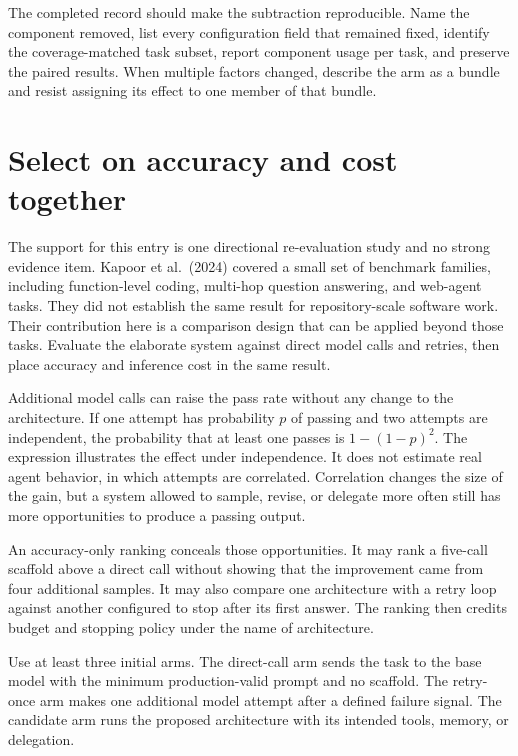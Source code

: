 The completed record should make the subtraction reproducible. Name the component removed, list every configuration field that remained fixed, identify the coverage-matched task subset, report component usage per task, and preserve the paired results. When multiple factors changed, describe the arm as a bundle and resist assigning its effect to one member of that bundle.

\section{Select on accuracy and cost together}\label{select-on-accuracy-and-cost-together}

The support for this entry is one directional re-evaluation study and no strong evidence item. Kapoor et al.~(2024) covered a small set of benchmark families, including function-level coding, multi-hop question answering, and web-agent tasks. They did not establish the same result for repository-scale software work. Their contribution here is a comparison design that can be applied beyond those tasks. Evaluate the elaborate system against direct model calls and retries, then place accuracy and inference cost in the same result.

Additional model calls can raise the pass rate without any change to the architecture. If one attempt has probability \(p\) of passing and two attempts are independent, the probability that at least one passes is \(1-(1-p)^2\). The expression illustrates the effect under independence. It does not estimate real agent behavior, in which attempts are correlated. Correlation changes the size of the gain, but a system allowed to sample, revise, or delegate more often still has more opportunities to produce a passing output.

An accuracy-only ranking conceals those opportunities. It may rank a five-call scaffold above a direct call without showing that the improvement came from four additional samples. It may also compare one architecture with a retry loop against another configured to stop after its first answer. The ranking then credits budget and stopping policy under the name of architecture.

Use at least three initial arms. The direct-call arm sends the task to the base model with the minimum production-valid prompt and no scaffold. The retry-once arm makes one additional model attempt after a defined failure signal. The candidate arm runs the proposed architecture with its intended tools, memory, or delegation.

